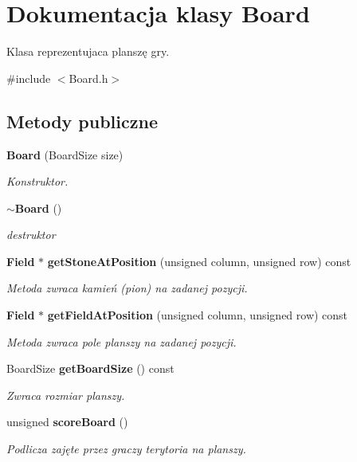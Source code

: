 \section{Dokumentacja klasy Board}
\label{class_board}


Klasa reprezentujaca planszę gry.  




{\ttfamily \#include $<$Board.\+h$>$}

\subsection*{Metody publiczne}
\begin{DoxyCompactItemize}
\item 
\textbf{ Board} (Board\+Size size)
\begin{DoxyCompactList}\small\item\em Konstruktor. \end{DoxyCompactList}\item 
\textbf{ $\sim$\+Board} ()
\begin{DoxyCompactList}\small\item\em destruktor \end{DoxyCompactList}\item 
\textbf{ Field} $\ast$ \textbf{ get\+Stone\+At\+Position} (unsigned column, unsigned row) const
\begin{DoxyCompactList}\small\item\em Metoda zwraca kamień (pion) na zadanej pozycji. \end{DoxyCompactList}\item 
\textbf{ Field} $\ast$ \textbf{ get\+Field\+At\+Position} (unsigned column, unsigned row) const
\begin{DoxyCompactList}\small\item\em Metoda zwraca pole planszy na zadanej pozycji. \end{DoxyCompactList}\item 
Board\+Size \textbf{ get\+Board\+Size} () const
\begin{DoxyCompactList}\small\item\em Zwraca rozmiar planszy. \end{DoxyCompactList}\item 
unsigned \textbf{ score\+Board} ()
\begin{DoxyCompactList}\small\item\em Podlicza zajęte przez graczy terytoria na planszy. \end{DoxyCompactList}\item 

\end{DoxyCompactItemize}
